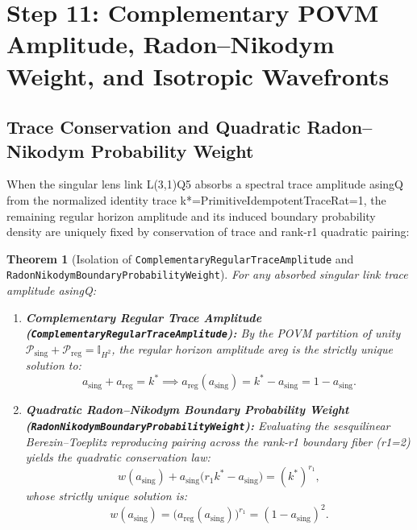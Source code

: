 \documentclass[11pt,reqno]{amsart}
\newtheorem{theorem}{Theorem}[section]
\theoremstyle{definition}
\theoremstyle{remark}
\newcommand{\Id}{\mathbb{I}}
\begin{document}
\section{Step 11: Complementary POVM Amplitude, Radon--Nikodym Weight, and Isotropic Wavefronts}

\subsection{Trace Conservation and Quadratic Radon--Nikodym Probability Weight}

When the singular lens link L(3,1)Q5 absorbs a spectral trace amplitude asingQ from the normalized identity trace k*=PrimitiveIdempotentTraceRat=1, the remaining regular horizon amplitude and its induced boundary probability density are uniquely fixed by conservation of trace and rank-r1 quadratic pairing:

\begin{theorem}[Isolation of \texttt{ComplementaryRegularTraceAmplitude} and \texttt{RadonNikodymBoundaryProbabilityWeight}]
\label{thm:radon_nikodym_weight}
For any absorbed singular link trace amplitude asingQ:
\begin{enumerate}[label=(\roman*)]
  \item \textbf{Complementary Regular Trace Amplitude (\texttt{ComplementaryRegularTraceAmplitude}):} By the POVM partition of unity $\mathcal{P}_{\mathrm{sing}} + \mathcal{P}_{\mathrm{reg}} = \Id_{H^2}$, the regular horizon amplitude areg is the strictly unique solution to:
  \begin{equation}
    a_{\mathrm{sing}} + a_{\mathrm{reg}} = k^* \implies a_{\mathrm{reg}}(a_{\mathrm{sing}}) = k^* - a_{\mathrm{sing}} = 1 - a_{\mathrm{sing}}.
  \end{equation}
  \item \textbf{Quadratic Radon--Nikodym Boundary Probability Weight (\texttt{RadonNikodymBoundaryProbabilityWeight}):} Evaluating the sesquilinear Berezin--Toeplitz reproducing pairing across the rank-r1 boundary fiber (r1=2) yields the quadratic conservation law:
  \begin{equation}
    w(a_{\mathrm{sing}}) + a_{\mathrm{sing}}\bigl(r_1 k^* - a_{\mathrm{sing}}\bigr) = (k^*)^{r_1},
  \end{equation}
  whose strictly unique solution is:
  \begin{equation}
    w(a_{\mathrm{sing}}) = \bigl(a_{\mathrm{reg}}(a_{\mathrm{sing}})\bigr)^{r_1} = (1 - a_{\mathrm{sing}})^2.
  \end{equation}
\end{enumerate}
\end{theorem}
\end{document}
